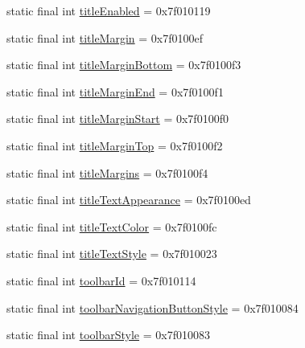 \begin{CompactItemize}
\item 
static final int \hyperlink{classandroid_1_1support_1_1v7_1_1recyclerview_1_1_r_1_1attr_6d2feb89d2b0068783c19518659f4c89}{titleEnabled} = 0x7f010119
\item 
static final int \hyperlink{classandroid_1_1support_1_1v7_1_1recyclerview_1_1_r_1_1attr_9beb8905f6b42d8a958f221ed5a81cca}{titleMargin} = 0x7f0100ef
\item 
static final int \hyperlink{classandroid_1_1support_1_1v7_1_1recyclerview_1_1_r_1_1attr_eeef1af49a9f1471a5640d12cc8cb81e}{titleMarginBottom} = 0x7f0100f3
\item 
static final int \hyperlink{classandroid_1_1support_1_1v7_1_1recyclerview_1_1_r_1_1attr_ccf269ea34a19027343c20837fe270c5}{titleMarginEnd} = 0x7f0100f1
\item 
static final int \hyperlink{classandroid_1_1support_1_1v7_1_1recyclerview_1_1_r_1_1attr_c574dea5acc47a92fed730f0bfd58c0d}{titleMarginStart} = 0x7f0100f0
\item 
static final int \hyperlink{classandroid_1_1support_1_1v7_1_1recyclerview_1_1_r_1_1attr_fe746bb211b5637156bf6d7dbfcb32e5}{titleMarginTop} = 0x7f0100f2
\item 
static final int \hyperlink{classandroid_1_1support_1_1v7_1_1recyclerview_1_1_r_1_1attr_e4601faed0228211460275a537550857}{titleMargins} = 0x7f0100f4
\item 
static final int \hyperlink{classandroid_1_1support_1_1v7_1_1recyclerview_1_1_r_1_1attr_05ccd4ebfaa0eb88fb8905c7ce8ca631}{titleTextAppearance} = 0x7f0100ed
\item 
static final int \hyperlink{classandroid_1_1support_1_1v7_1_1recyclerview_1_1_r_1_1attr_19b8b19ceb993d02150f5f8a10beddab}{titleTextColor} = 0x7f0100fc
\item 
static final int \hyperlink{classandroid_1_1support_1_1v7_1_1recyclerview_1_1_r_1_1attr_a0cd46feb044c30ec1747d972dd074c2}{titleTextStyle} = 0x7f010023
\item 
static final int \hyperlink{classandroid_1_1support_1_1v7_1_1recyclerview_1_1_r_1_1attr_8b401a71bfe72fe32a2cf13ab1d5e7d6}{toolbarId} = 0x7f010114
\item 
static final int \hyperlink{classandroid_1_1support_1_1v7_1_1recyclerview_1_1_r_1_1attr_e0e1ce28bc8191269b1653b4d5e3ad3a}{toolbarNavigationButtonStyle} = 0x7f010084
\item 
static final int \hyperlink{classandroid_1_1support_1_1v7_1_1recyclerview_1_1_r_1_1attr_3022654176541f240d5849243ab4d1a3}{toolbarStyle} = 0x7f010083
\item 

\end{CompactItemize}
